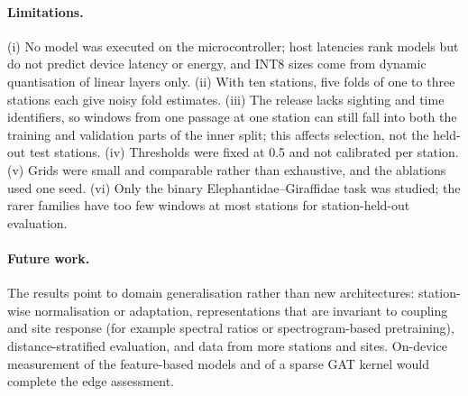 \documentclass[a4paper,fleqn]{cas-dc}
\begin{document}
\paragraph{Limitations.} (i) No model was executed on the microcontroller; host
latencies rank models but do not predict device latency or energy, and INT8 sizes come
from dynamic quantisation of linear layers only. (ii) With ten stations, five folds of
one to three stations each give noisy fold estimates. (iii) The release lacks sighting
and time identifiers, so windows from one passage at one station can still fall into
both the training and validation parts of the inner split; this affects selection, not
the held-out test stations. (iv) Thresholds were fixed at 0.5 and not calibrated per
station. (v) Grids were small and comparable rather than exhaustive, and the ablations
used one seed. (vi) Only the binary Elephantidae--Giraffidae task was studied; the
rarer families have too few windows at most stations for station-held-out evaluation.

\paragraph{Future work.} The results point to domain generalisation rather than new
architectures: station-wise normalisation or adaptation, representations that are
invariant to coupling and site response (for example spectral ratios or
spectrogram-based pretraining), distance-stratified evaluation, and data from more
stations and sites. On-device measurement of the feature-based models and of a sparse
GAT kernel would complete the edge assessment.

\FloatBarrier
\end{document}
